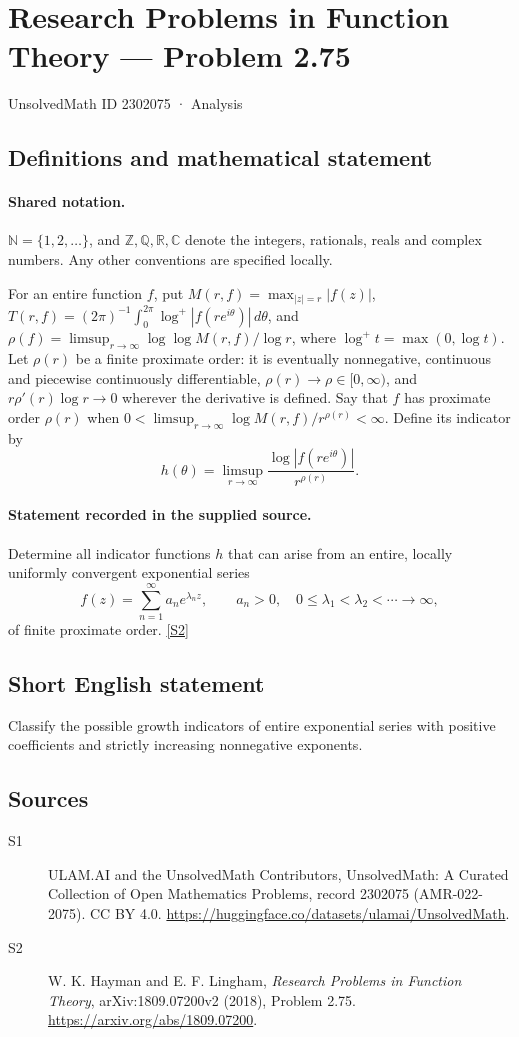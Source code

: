 \documentclass[11pt]{article}
\newcommand{\sref}[2]{\hyperlink{source:#1:#2}{[S#2]}}
\begin{document}
\setcounter{section}{2302074}
\section{Research Problems in Function Theory — Problem 2.75}\label{2302075}
{\small\sffamily UnsolvedMath ID 2302075 · Analysis}
\subsection{Definitions and mathematical statement}

\paragraph{Shared notation.}$\mathbb N=\{1,2,\ldots\}$, and $\mathbb Z,\mathbb Q,\mathbb R,\mathbb C$ denote the integers, rationals, reals and complex numbers. Any other conventions are specified locally.


For an entire function $f$, put $M(r,f)=\max_{|z|=r}|f(z)|$, $T(r,f)=(2\pi)^{-1}\int_0^{2\pi}\log^+|f(re^{i\theta})|\,d\theta$, and $\rho(f)=\limsup_{r\to\infty}\log\log M(r,f)/\log r$, where $\log^+t=\max(0,\log t)$. Let $\rho(r)$ be a finite proximate order: it is eventually nonnegative, continuous and piecewise continuously differentiable, $\rho(r)\to\rho\in[0,\infty)$, and $r\rho'(r)\log r\to0$ wherever the derivative is defined. Say that $f$ has proximate order $\rho(r)$ when $0<\limsup_{r\to\infty}\log M(r,f)/r^{\rho(r)}<\infty$. Define its indicator by
\[h(\theta)=\limsup_{r\to\infty}\frac{\log|f(re^{i\theta})|}{r^{\rho(r)}}.\]
\paragraph{Statement recorded in the supplied source.}
Determine all indicator functions $h$ that can arise from an entire, locally uniformly convergent exponential series
\[f(z)=\sum_{n=1}^{\infty}a_n e^{\lambda_n z},\qquad a_n>0,\quad0\leq\lambda_1<\lambda_2<\cdots\to\infty,\]
of finite proximate order. \sref{2302075}{2}
\subsection{Short English statement}
Classify the possible growth indicators of entire exponential series with positive coefficients and strictly increasing nonnegative exponents.
\subsection{Sources}
\begin{description}
\item[\hypertarget{source:2302075:1}{S1}] ULAM.AI and the UnsolvedMath Contributors, UnsolvedMath: A Curated Collection of Open Mathematics Problems, record 2302075 (AMR-022-2075). CC BY 4.0. \url{https://huggingface.co/datasets/ulamai/UnsolvedMath}.
\item[\hypertarget{source:2302075:2}{S2}] W. K. Hayman and E. F. Lingham, \emph{Research Problems in Function Theory}, arXiv:1809.07200v2 (2018), Problem 2.75. \url{https://arxiv.org/abs/1809.07200}.
\end{description}
\label{end:2302075}
\end{document}
